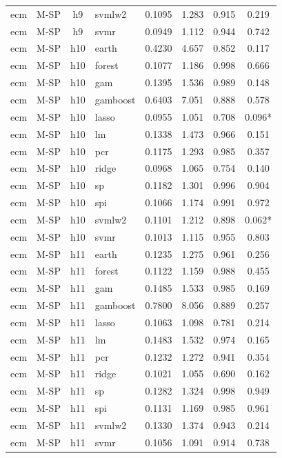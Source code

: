 \begin{ThreePartTable}
\begin{longtable}[t]{llclcccc}
ecm & M-SP & h9 & svmlw2 & 0.1095 & 1.283 & 0.915 & 0.219\\
ecm & M-SP & h9 & svmr & 0.0949 & 1.112 & 0.944 & 0.742\\
\addlinespace
ecm & M-SP & h10 & earth & 0.4230 & 4.657 & 0.852 & 0.117\\
ecm & M-SP & h10 & forest & 0.1077 & 1.186 & 0.998 & 0.666\\
ecm & M-SP & h10 & gam & 0.1395 & 1.536 & 0.989 & 0.148\\
ecm & M-SP & h10 & gamboost & 0.6403 & 7.051 & 0.888 & 0.578\\
ecm & M-SP & h10 & lasso & 0.0955 & 1.051 & 0.708 & 0.096*\\
ecm & M-SP & h10 & lm & 0.1338 & 1.473 & 0.966 & 0.151\\
ecm & M-SP & h10 & pcr & 0.1175 & 1.293 & 0.985 & 0.357\\
ecm & M-SP & h10 & ridge & 0.0968 & 1.065 & 0.754 & 0.140\\
ecm & M-SP & h10 & sp & 0.1182 & 1.301 & 0.996 & 0.904\\
ecm & M-SP & h10 & spi & 0.1066 & 1.174 & 0.991 & 0.972\\
ecm & M-SP & h10 & svmlw2 & 0.1101 & 1.212 & 0.898 & 0.062*\\
ecm & M-SP & h10 & svmr & 0.1013 & 1.115 & 0.955 & 0.803\\
\addlinespace
ecm & M-SP & h11 & earth & 0.1235 & 1.275 & 0.961 & 0.256\\
ecm & M-SP & h11 & forest & 0.1122 & 1.159 & 0.988 & 0.455\\
ecm & M-SP & h11 & gam & 0.1485 & 1.533 & 0.985 & 0.169\\
ecm & M-SP & h11 & gamboost & 0.7800 & 8.056 & 0.889 & 0.257\\
ecm & M-SP & h11 & lasso & 0.1063 & 1.098 & 0.781 & 0.214\\
ecm & M-SP & h11 & lm & 0.1483 & 1.532 & 0.974 & 0.165\\
ecm & M-SP & h11 & pcr & 0.1232 & 1.272 & 0.941 & 0.354\\
ecm & M-SP & h11 & ridge & 0.1021 & 1.055 & 0.690 & 0.162\\
ecm & M-SP & h11 & sp & 0.1282 & 1.324 & 0.998 & 0.949\\
ecm & M-SP & h11 & spi & 0.1131 & 1.169 & 0.985 & 0.961\\
ecm & M-SP & h11 & svmlw2 & 0.1330 & 1.374 & 0.943 & 0.214\\
ecm & M-SP & h11 & svmr & 0.1056 & 1.091 & 0.914 & 0.738\\

\end{longtable}
\end{ThreePartTable}

